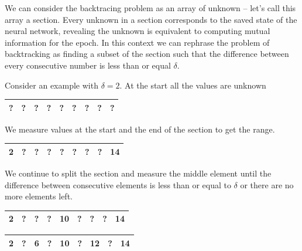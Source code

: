 \documentclass[dissertation.tex]{subfiles}
\begin{document}
  We can consider the backtracing problem as an array of unknown -- let's call
  this array a section. Every unknown in a section corresponds to the saved
  state of the neural network, revealing the unknown is equivalent to computing
  mutual information for the epoch. In this context we can rephrase the problem
  of backtracking as finding a subset of the section such that the difference
  between every consecutive number is less than or equal $\delta$.

  Consider an example with $\delta = 2$.
  At the start all the values are unknown 

  \begin{table}[H]
    \centering
      \begin{tabular}{|c|c|c|c|c|c|c|c|c|}
      \hline			
        ?&?&?&?&?&?&?&?&? \\
      \hline  
    \end{tabular}
  \end{table}

  We measure values at the start and the end of the section to get the range.

  \begin{table}[H]
    \centering
      \begin{tabular}{|c|c|c|c|c|c|c|c|c|}
      \hline			
        \bf{2}&?&?&?&?&?&?&?&\bf{14}\\
      \hline  
    \end{tabular}
  \end{table}

  We continue to split the section and measure the middle element until the
  difference between consecutive elements is less than or equal to $\delta$ or
  there are no more elements left.


  \begin{table}[H]
    \centering
      \begin{tabular}{|c|c|c|c|c|c|c|c|c|}
      \hline			
        2&?&?&?&\bf{10}&?&?&?&14\\
      \hline  
    \end{tabular}
  \end{table}

  \begin{table}[H]
    \centering
      \begin{tabular}{|c|c|c|c|c|c|c|c|c|}
      \hline			
        2&?&\bf{6}&?&10&?&\bf{12}&?&14\\
      \hline  
    \end{tabular}
  \end{table}
\end{document}
